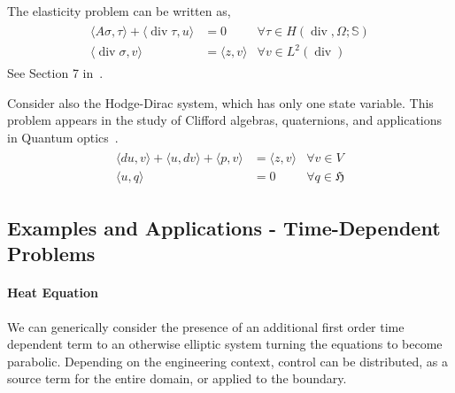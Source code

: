 \documentclass{article}
\DeclareMathOperator{\divergence}{div}
\begin{document}
The elasticity problem can be written as,
\begin{align*}
	\begin{array}{rll}
		\langle A \sigma, \tau \rangle +\langle \divergence \tau,u\rangle
		 & = 0
		 & \forall \tau \in H(\divergence,\Omega;\mathbb{S})
		\\
		\langle \divergence \sigma,v \rangle
		 & = \langle z,v \rangle
		 & \forall v \in L^2(\divergence)
	\end{array}
\end{align*}
See Section 7 in~\cite{arnold2010finite}.


Consider also the Hodge-Dirac system, which has only one state variable. This problem appears in the study of Clifford algebras, quaternions, and applications in Quantum optics~\cite{leopardi2016abstract}.
\begin{align}
	\begin{array}{rll}
		\langle du,v \rangle + \langle u, d v \rangle + \langle p,v \rangle
		 & = \langle z,v \rangle
		 & \forall v \in V
		\\
		\langle u, q \rangle
		 & = 0
		 & \forall q \in \mathfrak H
	\end{array}
\end{align}

\subsection{Examples and Applications - Time-Dependent Problems}

\paragraph{Heat Equation}


We can generically consider the presence of an additional first order time dependent term to an otherwise elliptic system turning the equations to become parabolic.
Depending on the engineering context, control can be distributed, as a source term for the entire domain, or applied to the boundary.
\end{document}
